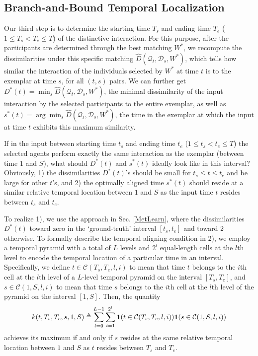 \subsection{Branch-and-Bound Temporal Localization}
\label{BB}
\vspace{-5pt}
Our third step is to determine the starting time $T_s$ and ending time $T_e$ ($1\le T_s<T_e\le T$) of the distinctive interaction. For this purpose, after the participants are determined through the best matching $W^{*}$, we recompute the dissimilarities under this specific matching $\hat{D}(\mathcal{Q}_{t}, \mathcal{D}_{s}, W^{*})$, which tells how similar the interaction of the individuals selected by $W^{*}$ at time $t$ is to the exemplar at time $s$, for all $(t,s)$ pairs. We can further get  $D^{*}(t)=\min_{s}\hat{D}(\mathcal{Q}_{t}, \mathcal{D}_{s}, W^{*})$, the minimal dissimilarity of the input interaction by the selected participants to the entire exemplar, as well as $s^{*}(t)=\arg\min_{s}\hat{D}(\mathcal{Q}_{t}, \mathcal{D}_{s}, W^{*})$, the time in the exemplar at which the input at time $t$ exhibits this maximum similarity.  

If in the input between starting time $t_{s}$ and ending time $t_{e}$ ($1\leq t_{s}<t_{e}\leq T$) the selected agents perform exactly the same interaction as the exemplar (between time $1$ and $S$), what should $D^{*}(t)$ and $s^{*}(t)$ ideally look like in this interval? Obviously, 1) the dissimilarities $D^{*}(t)$'s should be small for $t_{s}\le t\le t_{e}$ and be large for other $t$'s, and 2) the optimally aligned time $s^{*}(t)$ should reside at a similar relative temporal location between $1$ and $S$ as the input time $t$ resides between $t_{s}$ and $t_{e}$.

To realize 1), we use the approach in Sec. \ref{MetLearn}, where the dissimilarities $D^{*}(t)$ toward zero in the `ground-truth' interval $[t_{s}, t_{e}]$ and toward $2$ otherwise. To formally describe the temporal aligning condition in 2), we employ a temporal pyramid with a total of $L$ levels and $2^{l}$ equal-length cells at the $l$th level to encode the temporal location of a particular time in an interval. Specifically, we define $t\in\mathcal{C}(T_{s},T_{e}, l,i)$ to mean that time $t$ belongs to the $i$th cell at the $l$th level of a $L$-level temporal pyramid on the interval $[T_{s},T_{e}]$, and $s\in\mathcal{C}(1,S, l,i)$ to mean that time $s$ belongs to the $i$th cell at the $l$th level of the pyramid on the interval $[1,S]$. Then, the quantity
\begin{equation}
\vspace{-5pt}
k(t, T_{s},T_{e}, s, 1,S)\triangleq\sum^{L-1}_{l=0}\sum^{2^{l}}_{i=1} \mathbf{1}(t\in\mathcal{C}(T_{s},T_{e}, l,i))\mathbf{1}(s\in\mathcal{C}(1,S, l,i))
\end{equation}
achieves its maximum if and only if $s$ resides at the same relative temporal location between $1$ and $S$ as $t$ resides between $T_{s}$ and $T_{e}$.

